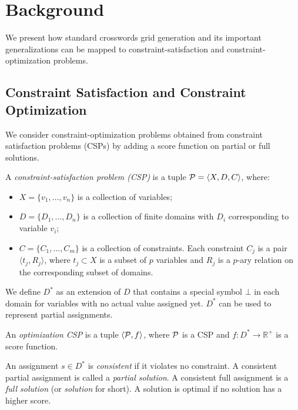 

\section{Background}
\label{sec::background}

We present how standard crosswords grid generation and its important generalizations
can be mapped to constraint-satisfaction and constraint-optimization problems.

\subsection{Constraint Satisfaction and Constraint Optimization}

We consider constraint-optimization problems
obtained from
constraint satisfaction problems (CSPs) by adding a score function on partial
or full solutions.

\bdf
A \emph{constraint-satisfaction problem (CSP)} is a tuple ${\cal P} = \langle X, D, C \rangle$,
where:
\begin{itemize} 
\item $X = \{v_1, \dots, v_n\}$ is a collection of variables;
\item $D = \{D_1, \dots, D_n\}$ is a collection of finite domains with $D_i$ corresponding to variable $v_i$;
\item $C = \{C_1, \dots, C_m\}$ is a collection of constraints. Each constraint $C_j$ is a pair $\langle t_j, R_j \rangle$, where $t_j \subset X$ is a subset of $p$ variables and $R_j$ is a $p$-ary relation on the corresponding subset of domains.
\end{itemize}
\edf

\noindent We define $D^*$ as an extension of $D$ that contains a special symbol $\bot$ in each domain for variables with no actual value assigned yet. $D^*$ can be used to represent partial assignments.

\bdf
An \emph{optimization CSP} is a tuple $\langle {\cal P}, f \rangle$, 
where ${\cal P}$ is a CSP and 
$f : D^* \rightarrow \mathbb{R}^+$ is a score function.
\edf

An assignment $s \in D^*$ is {\em consistent} if 
it violates no constraint.
A consistent partial assignment is called a {\em partial solution}.
A consistent full assignment is a {\em full solution} (or {\em solution} for short).
A solution is optimal if no solution has a higher score.

